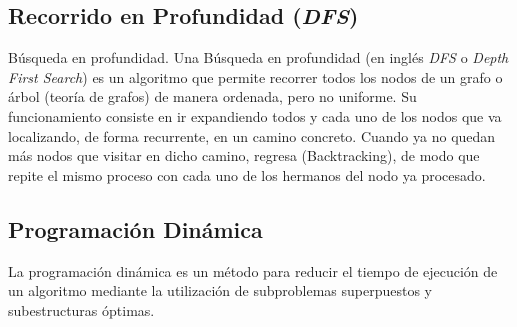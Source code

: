 \subsection{Recorrido en Profundidad (\emph{DFS})}
Búsqueda en profundidad. Una Búsqueda en profundidad (en inglés \emph{DFS} o \emph{Depth First Search}) es un algoritmo que permite recorrer todos los nodos de un grafo o árbol (teoría de grafos) de manera ordenada, pero no uniforme. Su funcionamiento consiste en ir expandiendo todos y cada uno de los nodos que va localizando, de forma recurrente, en un camino concreto. Cuando ya no quedan más nodos que visitar en dicho camino, regresa (Backtracking), de modo que repite el mismo proceso con cada uno de los hermanos del nodo ya procesado. 

\subsection{Programación Dinámica}
La programación dinámica es un método para reducir el tiempo de ejecución de un algoritmo mediante la utilización de subproblemas superpuestos y subestructuras óptimas. 